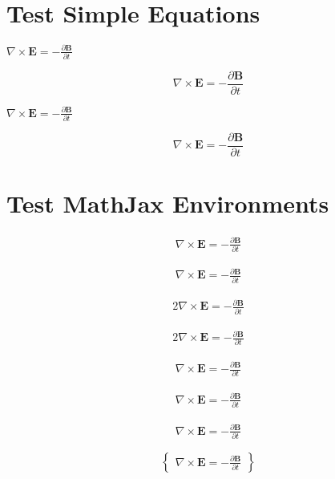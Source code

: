 \documentclass{article}
\begin{document}
\section{Test Simple Equations}

$\nabla \times \mathbf{E} = - \frac{\partial \mathbf{B}}{\partial t}$

$$\nabla \times \mathbf{E} = - \frac{\partial \mathbf{B}}{\partial t}$$

\(\nabla \times \mathbf{E} = - \frac{\partial \mathbf{B}}{\partial t}\)

\[\nabla \times \mathbf{E} = - \frac{\partial \mathbf{B}}{\partial t}\]

\section{Test MathJax Environments}

\begin{align}
\nabla \times \mathbf{E} = - \frac{\partial \mathbf{B}}{\partial t}
\end{align}

\begin{align*}
\nabla \times \mathbf{E} = - \frac{\partial \mathbf{B}}{\partial t}
\end{align*}

\begin{alignat}{2}
\nabla \times \mathbf{E} = - \frac{\partial \mathbf{B}}{\partial t}
\end{alignat}

\begin{alignat*}{2}
\nabla \times \mathbf{E} = - \frac{\partial \mathbf{B}}{\partial t}
\end{alignat*}

\[
\begin{aligned}
\nabla \times \mathbf{E} = - \frac{\partial \mathbf{B}}{\partial t}
\end{aligned}
\]

\[
\begin{alignedat}{2}
\nabla \times \mathbf{E} = - \frac{\partial \mathbf{B}}{\partial t}
\end{alignedat}
\]

\[
\begin{array}{lcl}
\nabla \times \mathbf{E} = - \frac{\partial \mathbf{B}}{\partial t}
\end{array}
\]

\[
\begin{Bmatrix}
\nabla \times \mathbf{E} = - \frac{\partial \mathbf{B}}{\partial t}
\end{Bmatrix}
\]
\end{document}
